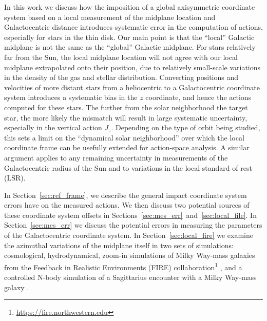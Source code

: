 \documentclass[twocolumn]{aastex62}
\begin{document}
In this work we discuss how the imposition of a global axisymmetric coordinate
system based on a local measurement of the midplane location and
Galactocentric distance introduces systematic error in the computation of
actions, especially for stars in the thin disk. Our main point is that the
``local'' Galactic midplane is not the same as the ``global'' Galactic
midplane. For stars relatively far from the Sun, the local midplane location
will not agree with our local midplane extrapolated onto their position,
due to relatively small-scale variations in the density of the gas and
stellar distribution. Converting positions and velocities of more distant
stars from a heliocentric to a Galactocentric coordinate system introduces a
systematic bias in the $z$ coordinate, and hence the actions computed for
these stars. The further from the solar neighborhood the target star, the more
likely the mismatch will result in large systematic uncertainty, especially in
the vertical action $J_z$. Depending on the type of orbit being studied, this
sets a limit on the ``dynamical solar neighborhood'' over which the local
coordinate frame can be usefully extended for action-space analysis. A similar
argument applies to any remaining uncertainty in measurements of the
Galactocentric radius of the Sun and to variations in the local
standard of rest (LSR).

In Section~\ref{sec:ref_frame}, we describe the general impact coordinate
system errors have on the measured actions. We then discuss two potential
sources of these coordinate system offsets in
Sections~\ref{sec:mes_err}~and~\ref{sec:local_file}. In
Section~\ref{sec:mes_err} we discuss the potential errors in measuring the
parameters of the Galactocentric coordinate system. In
Section~\ref{sec:local_fire} we examine the azimuthal variations of the
midplane itself in two sets of simulations: cosmological, hydrodynamical,
zoom-in simulations of Milky Way-mass galaxies from the Feedback in Realistic
Environments (FIRE)
collaboration\footnote{\url{https://fire.northwestern.edu}}
\citep{2016ApJ...827L..23W, 2017arXiv170206148H}, and a controlled N-body
simulation of a Sagittarius encounter with a Milky Way-mass galaxy
\citep{2018MNRAS.481..286L}.
\end{document}
